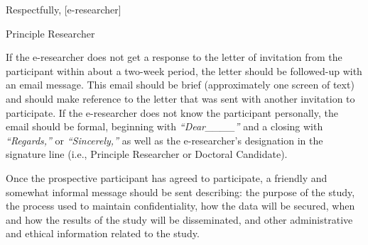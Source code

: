 \documentclass[a4paper]{book}
\begin{document}
\setcounter{page}{92}

\begin{addmargin}{2em}

\begin{spacing}{1.00}

\vspace{5mm}
\end{spacing}

\begin{flushleft}
\begin{spacing}{2.00}
{\small \textsf{Respectfully, [e-researcher]}}

{\small \textsf{Principle Researcher}}
\end{spacing}
\end{flushleft}
\end{addmargin}

If the e-researcher does not get a response to the letter of invitation from the participant within about a two-week period, the letter should be followed-up with an email message. This email should be brief (approximately one screen of text) and should make reference to the letter that was sent with another invitation to participate. If the e-researcher does not know the participant personally, the email should be formal, beginning with \emph{{``}Dear\_\_\_\_}\emph{''}  and a closing with \emph{{``}Regards,'' } or \emph{{``}Sincerely,'' } as well as the e-researcher's designation in the signature line (i.e., Principle Researcher or Doctoral Candidate).


Once the prospective participant has agreed to participate, a friendly and somewhat informal message should be sent describing: the purpose of the study, the process used to maintain confidentiality, how the data will be secured, when and how the results of the study will be disseminated, and other administrative and ethical information related to the study.


\begin{flushleft}

\end{flushleft}
\end{document}
